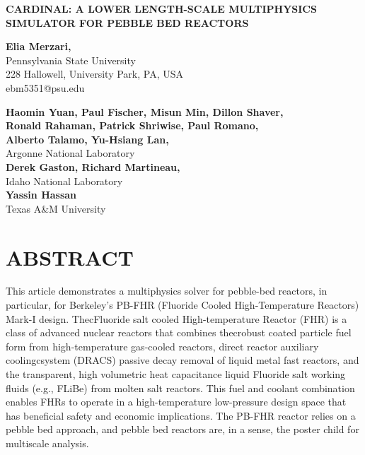 \documentclass[11pt,letterpaper,english]{article}
\begin{document}
\vspace*{-0.45in}
\begin{center}
{\Large\centering\bf CARDINAL: A LOWER LENGTH-SCALE MULTIPHYSICS SIMULATOR FOR PEBBLE BED REACTORS}

\vspace{3pt}

{\bf \large Elia Merzari,} \\
\large Pennsylvania State University \\
\large 228 Hallowell, University Park, PA, USA \\
{\color{brown} ebm5351@psu.edu} \\

\vspace{0.25in}

{\bf \large Haomin Yuan, Paul Fischer, Misun Min, Dillon Shaver,} \\
{\bf \large Ronald Rahaman, Patrick Shriwise, Paul Romano, } \\
{\bf \large Alberto Talamo, Yu-Hsiang Lan, } \\
\large Argonne National Laboratory \\
\vspace{0.45in}
{\bf \large Derek Gaston, Richard Martineau,} \\
\large Idaho National Laboratory \\
\vspace{0.45in}
{\bf \large  Yassin Hassan } \\
\large Texas A\&M University \\


\end{center}



\normalsize

\section*{ABSTRACT}

This article demonstrates a multiphysics solver for pebble-bed reactors, in particular, for Berkeley's PB-FHR (Fluoride Cooled High-Temperature Reactors) Mark-I design. ThecFluoride salt cooled High-temperature Reactor (FHR) is a class of advanced nuclear reactors that combines thecrobust coated particle fuel form from high-temperature gas-cooled reactors, direct reactor auxiliary coolingcsystem (DRACS) passive decay removal of liquid metal fast reactors, and the transparent, high volumetric heat capacitance liquid Fluoride salt working fluids (e.g., FLiBe) from molten salt reactors. This fuel and coolant combination enables FHRs to operate in a high-temperature low-pressure design space that has beneficial safety and economic implications. The PB-FHR reactor relies on a pebble bed approach, and pebble bed reactors are, in a sense, the poster child for multiscale analysis.
\end{document}
